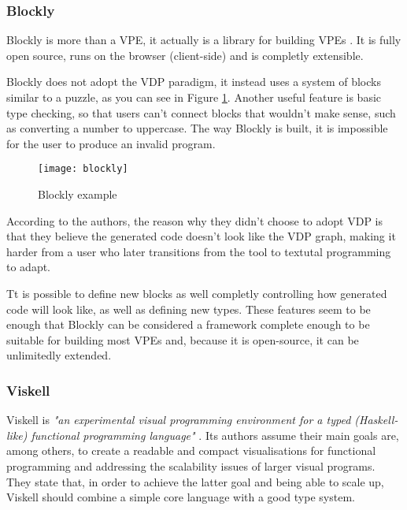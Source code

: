 \begin{itemsize}
\subsubsection{Blockly}

Blockly is more than a VPE, it actually is a library for building VPEs \cite{blockly}.
It is fully open source, runs on the browser (client-side) and is completly extensible.

Blockly does not adopt the VDP paradigm, it instead uses a system of blocks
similar to a puzzle, as you can see in Figure \ref{fig:blockly}.
Another useful feature is basic type checking,
so that users can't connect blocks that wouldn't make sense, such as converting
a number to uppercase. The way Blockly is built, it is impossible for the user
to produce an invalid program.

\begin{figure}[t]
  \begin{center}
    \leavevmode
    \texttt{[image: blockly]}
    \caption{Blockly example \cite{blockly}}
    \label{fig:blockly}
  \end{center}
\end{figure}

According to the authors, the reason why they didn't choose to adopt VDP is that
they believe the generated code doesn't look like the VDP graph, making it harder
from a user who later transitions from the tool to textutal programming to adapt.

Tt is possible to define new blocks as well completly controlling
how generated code will look like, as well as defining new types. These features
seem to be enough that Blockly can be considered a framework complete enough to
be suitable for building most VPEs and, because it is open-source, it can be
unlimitedly extended.

\subsubsection{Viskell}
\label{sec:viskell}

Viskell is \textit{"an experimental visual programming environment for a typed
(Haskell-like) functional programming language"} \cite{viskell}. Its authors
assume their main goals are, among others, to create a readable and compact
visualisations for functional programming and addressing the scalability issues
of larger visual programs. They state that, in order to achieve the latter goal
and being able to scale up, Viskell should combine a simple core language with
a good type system.


\end{itemsize}
